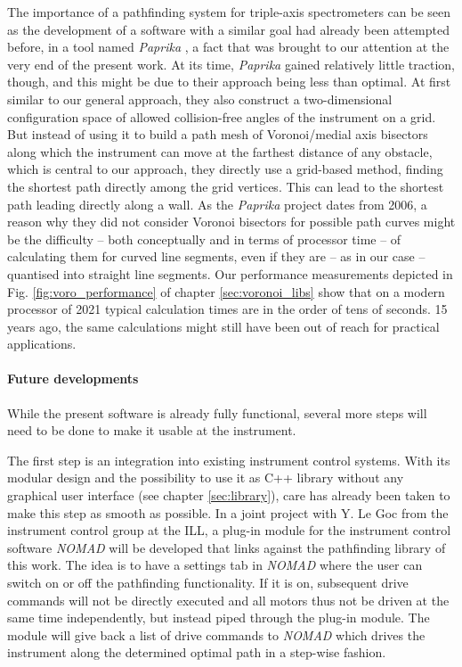 The importance of a pathfinding system for triple-axis spectrometers can be seen as the development
of a software with a similar goal had already been attempted before, in a tool named 
\textit{Paprika} \cite{Muehlbauer2006}, a fact that was brought to our attention at the very end of the present work.
At its time, \textit{Paprika} gained relatively little traction, though, and this might be due to their approach 
being less than optimal.
At first similar to our general approach, they also construct a two-dimensional configuration space of allowed collision-free 
angles of the instrument on a grid. But instead of using it to build a path mesh of Voronoi/medial axis 
bisectors along which the instrument can move at the farthest distance of any obstacle, which is central 
to our approach, they directly use a grid-based method, finding the shortest path directly among the grid vertices.
This can lead to the shortest path leading directly along a wall.
As the \textit{Paprika} project dates from 2006, a reason why they did not consider Voronoi bisectors 
for possible path curves might be the difficulty -- both conceptually and in terms of processor time -- 
of calculating them for curved line segments, even if they are -- as in our case -- quantised into straight 
line segments.
Our performance measurements depicted in Fig. \ref{fig:voro_performance} of chapter \ref{sec:voronoi_libs}
show that on a modern processor of 2021 typical calculation times are in the order of tens of seconds.
15 years ago, the same calculations might still have been out of reach for practical applications.


\paragraph{Future developments}
While the present software is already fully functional, several more steps will need to be done 
to make it usable at the instrument.

The first step is an integration into existing instrument control systems. 
With its modular design and the possibility to use it as C++ library without any graphical user interface
(see chapter \ref{sec:library}), care has already been taken to make this step as smooth as possible.
In a joint project with Y. Le Goc from the instrument control group at the ILL, a plug-in module for
the instrument control software \textit{NOMAD} \cite{web_NOMAD} will be developed that links against 
the pathfinding library of this work.
The idea is to have a settings tab in \textit{NOMAD} where the user can switch on or off the pathfinding
functionality. If it is on, subsequent drive commands will not be directly executed and all motors thus
not be driven at the same time independently, but instead piped through the plug-in module. 
The module will give back a list of drive commands to \textit{NOMAD} which drives the instrument
along the determined optimal path in a step-wise fashion.

